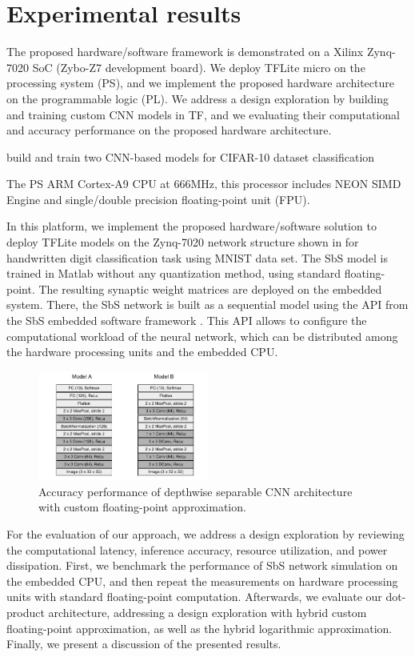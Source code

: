 \section{Experimental results}
\label{sec:experimental_results}
The proposed hardware/software framework is demonstrated on a Xilinx Zynq-7020 SoC (Zybo-Z7 development board). We deploy TFLite micro on the processing system (PS), and we implement the proposed hardware architecture on the programmable logic (PL). We address a design exploration by building and training custom CNN models in TF, and we evaluating their computational and accuracy performance on the proposed hardware architecture.

build and train two CNN-based models for CIFAR-10 dataset classification

The PS ARM Cortex-A9 CPU at 666MHz, this processor includes NEON SIMD Engine and single/double precision floating-point unit (FPU)\cite{xilinx2015zynq}.

In this platform, we implement the proposed hardware/software solution to deploy TFLite models on the Zynq-7020 network structure shown in  for handwritten digit classification task using MNIST data set. The SbS model is trained in Matlab without any quantization method, using standard floating-point. The resulting synaptic weight matrices are deployed on the embedded system. There, the SbS network is built as a sequential model using the API from the SbS embedded software framework \cite{nevarez2020accelerator}. This API allows to configure the computational workload of the neural network, which can be distributed among the hardware processing units and the embedded CPU.

\begin{figure}[t!]
	\centering
	\includegraphics[width=0.5\textwidth]{../figures/models.pdf}
	\caption{Accuracy performance of depthwise separable CNN architecture with custom floating-point approximation.}
	\label{fig:acc_custom}
\end{figure}

For the evaluation of our approach, we address a design exploration by reviewing the computational latency, inference accuracy, resource utilization, and power dissipation. First, we benchmark the performance of SbS network simulation on the embedded CPU, and then repeat the measurements on hardware processing units with standard floating-point computation. Afterwards, we evaluate our dot-product architecture, addressing a design exploration with hybrid custom floating-point approximation, as well as the hybrid logarithmic approximation. Finally, we present a discussion of the presented results.

